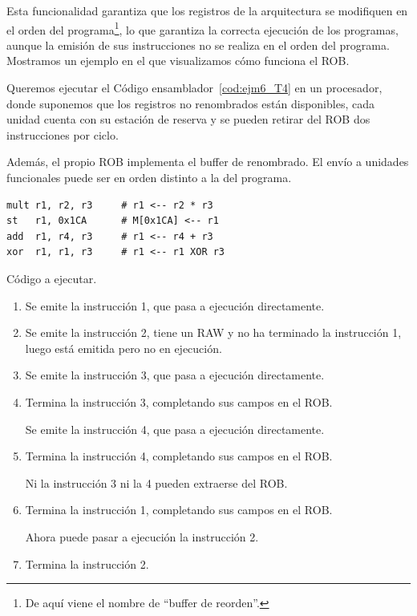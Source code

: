 Esta funcionalidad garantiza que los registros de la arquitectura se modifiquen en el orden del programa\footnote{De aquí viene el nombre de ``buffer de reorden''.}, lo que garantiza la correcta ejecución de los programas, aunque la emisión de sus instrucciones no se realiza en el orden del programa.\\

Mostramos un ejemplo en el que visualizamos cómo funciona el ROB.

\begin{ejemplo}
    Queremos ejecutar el Código ensamblador~\ref{cod:ejm6_T4} en un procesador, donde suponemos que los registros no renombrados están disponibles, cada unidad cuenta con su estación de reserva y se pueden retirar del ROB dos instrucciones por ciclo.

    Además, el propio ROB implementa el buffer de renombrado. El envío a unidades funcionales puede ser en orden distinto a la del programa.
    \begin{listing}[H]
    \begin{verbatim}
mult r1, r2, r3     # r1 <-- r2 * r3
st   r1, 0x1CA      # M[0x1CA] <-- r1
add  r1, r4, r3     # r1 <-- r4 + r3
xor  r1, r1, r3     # r1 <-- r1 XOR r3
    \end{verbatim}
    \caption{Código a ejecutar.}
    \label{cod:ejm6_T4}
    \end{listing}

    \begin{enumerate}
        \item Se emite la instrucción 1, que pasa a ejecución directamente.
        \item Se emite la instrucción 2, tiene un RAW y no ha terminado la instrucción 1, luego está emitida pero no en ejecución.
        \item Se emite la instrucción 3, que pasa a ejecución directamente.
        \item Termina la instrucción 3, completando sus campos en el ROB. 

            Se emite la instrucción 4, que pasa a ejecución directamente.
        \item Termina la instrucción 4, completando sus campos en el ROB.

            Ni la instrucción 3 ni la 4 pueden extraerse del ROB.
        \item Termina la instrucción 1, completando sus campos en el ROB.

            Ahora puede pasar a ejecución la instrucción 2.
        \item Termina la instrucción 2.


\end{enumerate}
\end{ejemplo}

